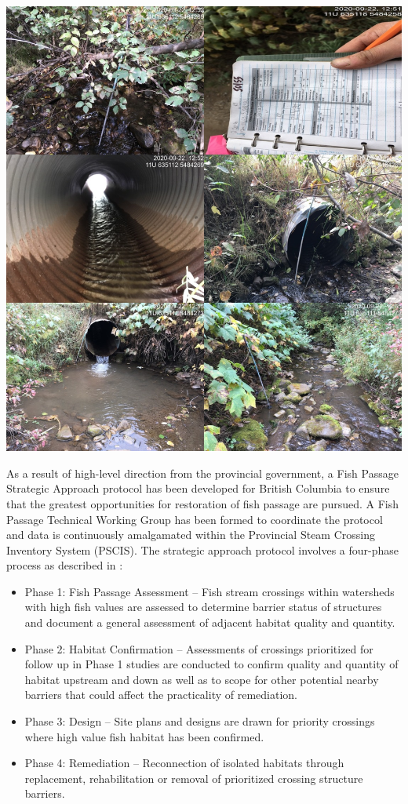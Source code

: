 \documentclass[
]{book}
\providecommand{\tightlist}{%
  \setlength{\itemsep}{0pt}\setlength{\parskip}{0pt}}
\begin{document}
\includegraphics[width=15.56in,]{data/photos/50155/crossing_all}

As a result of high-level direction from the provincial government, a Fish Passage Strategic Approach protocol has been developed for British Columbia to ensure that the greatest opportunities for restoration of fish passage are pursued. A Fish Passage Technical Working Group has been formed to coordinate the protocol and data is continuously amalgamated within the Provincial Steam Crossing Inventory System (PSCIS). The strategic approach protocol involves a four-phase process as described in \citet{fishpassagetechnicalworkinggroupFishPassageStrategic2014} :

\begin{itemize}
\tightlist
\item
  Phase 1: Fish Passage Assessment -- Fish stream crossings within watersheds with high fish values are assessed to determine barrier status of structures and document a general assessment of adjacent habitat quality and quantity.
\item
  Phase 2: Habitat Confirmation -- Assessments of crossings prioritized for follow up in Phase 1 studies are conducted to confirm quality and quantity of habitat upstream and down as well as to scope for other potential nearby barriers that could affect the practicality of remediation.
\item
  Phase 3: Design -- Site plans and designs are drawn for priority crossings where high value fish habitat has been confirmed.
\item
  Phase 4: Remediation -- Reconnection of isolated habitats through replacement, rehabilitation or removal of prioritized crossing structure barriers.
\end{itemize}
\end{document}
